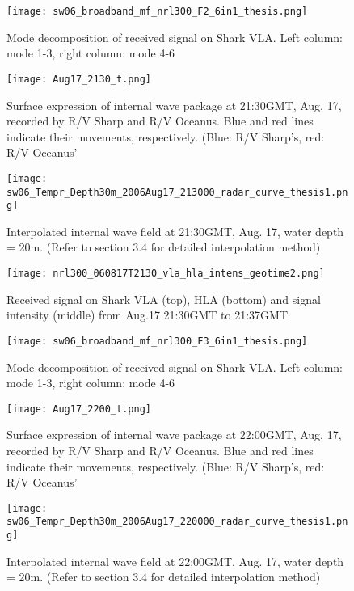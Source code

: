 \begin{figure}[H]
  \centering
  \texttt{[image: sw06\_broadband\_mf\_nrl300\_F2\_6in1\_thesis.png]}
  \caption{Mode decomposition of received signal on Shark VLA. 
    Left column: mode 1-3, right column: mode 4-6 }\label{fig:m2130}
\end{figure}


\begin{figure}[H]
  \centering
  \texttt{[image: Aug17\_2130\_t.png]}
  \caption{Surface expression of internal wave package at 21:30GMT, Aug. 17, recorded by R/V Sharp and R/V Oceanus. Blue and red lines indicate their movements, respectively. (Blue: R/V Sharp's, red: R/V Oceanus'}\label{fig:r2130_r}
\end{figure}

\begin{figure}[H]
  \centering
  \texttt{[image: sw06\_Tempr\_Depth30m\_2006Aug17\_213000\_radar\_curve\_thesis1.png]}
  \caption{Interpolated internal wave field at 21:30GMT, Aug. 17, water depth = 20m. (Refer to section 3.4 for detailed interpolation method)}\label{fig:r2130_i}
\end{figure}

\begin{figure}[H]
  \centering
  \texttt{[image: nrl300\_060817T2130\_vla\_hla\_intens\_geotime2.png]}
  \caption{Received signal on Shark VLA (top), HLA (bottom) and signal intensity (middle) from Aug.17 21:30GMT to 21:37GMT }\label{fig:a2130}
\end{figure}

\begin{figure}[H]
  \centering
  \texttt{[image: sw06\_broadband\_mf\_nrl300\_F3\_6in1\_thesis.png]}
  \caption{Mode decomposition of received signal on Shark VLA. 
    Left column: mode 1-3, right column: mode 4-6 }\label{fig:m2130}
\end{figure}
\clearpage

\begin{figure}[H]
  \centering
  \texttt{[image: Aug17\_2200\_t.png]}
  \caption{Surface expression of internal wave package at 22:00GMT, Aug. 17, recorded by R/V Sharp and R/V Oceanus. Blue and red lines indicate their movements, respectively. (Blue: R/V Sharp's, red: R/V Oceanus'}\label{fig:r2130_r}
\end{figure}

\begin{figure}[H]
  \centering
  \texttt{[image: sw06\_Tempr\_Depth30m\_2006Aug17\_220000\_radar\_curve\_thesis1.png]}
  \caption{Interpolated internal wave field at 22:00GMT, Aug. 17, water depth = 20m. (Refer to section 3.4 for detailed interpolation method)}\label{fig:r2130_i}
\end{figure}

